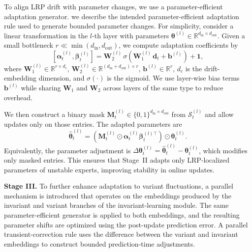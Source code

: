 ﻿\documentclass[journal]{IEEEtran}
\DeclareRobustCommand{\oldtext}[1]{{\color{revisionred}#1}}
\DeclareRobustCommand{\newtext}[1]{{\color{revisionblue}#1}}
\DeclareRobustCommand{\why}[1]{{\color{revisionblue}{\footnotesize (#1)}}}
\DeclareRobustCommand{\rw}[3]{\oldtext{#1} \newtext{#2}\why{#3}}
\begin{document}
To align LRP drift with parameter changes, \rw{we use a parameter-efficient adaptation generator.}{we describe the intended parameter-efficient adaptation rule used to generate bounded parameter changes.}{当前代码证据不足以证明 generator 被单独训练，改为实现安全表述。} For simplicity, consider a linear transformation in the $l$-th layer with parameters $\boldsymbol{\theta}^{(l)}\in\mathbb{R}^{d_{\mathrm{in}}\times d_{\mathrm{out}}}$. Given a small bottleneck $r\ll\min(d_{\mathrm{in}},d_{\mathrm{out}})$, we compute adaptation coefficients by
\begin{equation}
\left[{\boldsymbol{\alpha}}^{(l)}_t,{\boldsymbol{\beta}}^{(l)}_t\right]
=\mathbf{W}^{(l)}_2\,\sigma\!\left(\mathbf{W}^{(l)}_1\,\mathbf{d}_t+\mathbf{b}^{(l)}\right)+\mathbf{1},
\end{equation}
where $\mathbf{W}^{(l)}_1\in\mathbb{R}^{r\times d_c}$, $\mathbf{W}^{(l)}_2\in\mathbb{R}^{(d_{\mathrm{in}}+d_{\mathrm{out}})\times r}$, $\mathbf{b}^{(l)}\in\mathbb{R}^{r}$, $d_c$ is the drift-embedding dimension, and $\sigma(\cdot)$ is the sigmoid. We use layer-wise bias terms $\mathbf{b}^{(l)}$ while sharing $\mathbf{W}_1$ and $\mathbf{W}_2$ across layers of the same type to reduce overhead.

We then construct a binary mask $\mathbf{M}_t^{(l)}\in\{0,1\}^{d_{\mathrm{in}}\times d_{\mathrm{out}}}$ from $\mathcal{S}_t^{(l)}$ and allow updates only on those entries. The adapted parameters are
\begin{equation}
\widehat{\boldsymbol{\theta}}^{(l)}_t=\left(\mathbf{M}_t^{(l)}\odot {\boldsymbol{\alpha}}^{(l)}_t {\boldsymbol{\beta}}^{(l)\top}_t\right)\odot \boldsymbol{\theta}_t^{(l)}.
\end{equation}
Equivalently, the parameter adjustment is $\Delta\boldsymbol{\theta}^{(l)}_t=\widehat{\boldsymbol{\theta}}^{(l)}_t-\boldsymbol{\theta}_t^{(l)}$, which modifies only masked entries. This ensures that Stage~II adapts only LRP-localized parameters of unstable experts, improving stability in online updates. 

\textbf{Stage III.} To further enhance adaptation to variant fluctuations, a parallel mechanism is introduced that operates on the embeddings produced by the invariant and variant branches of the invariant-learning module. \rw{The same parameter-efficient generator is applied to both embeddings, and the resulting parameter shifts are optimized using the post-update prediction error.}{A parallel transient-correction rule uses the difference between the variant and invariant embeddings to construct bounded prediction-time adjustments.}{避免暗示已验证的 generator 训练与当前标签可用性。}
\end{document}
